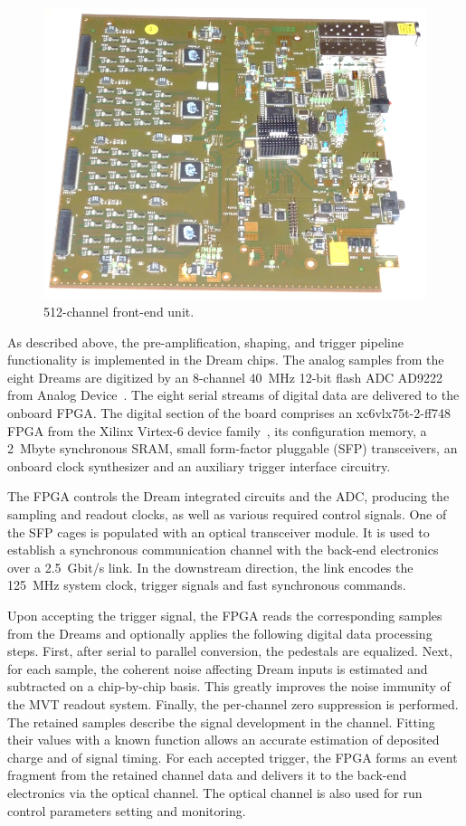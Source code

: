 \begin{figure}[htb]
 \includegraphics[width=1.0\columnwidth,keepaspectratio]{images/electronics_fig3.png}
 \caption{512-channel front-end unit.}
 \label{fig:mm-e_3}
\end{figure}

As described above, the pre-amplification, shaping, and trigger pipeline functionality is implemented in the Dream chips. The analog samples from the eight Dreams are digitized by an 8-channel 40~MHz 12-bit flash ADC AD9222 from Analog Device~\cite{ADC}. The eight serial streams of digital data are delivered to the onboard FPGA.
The digital section of the board comprises an xc6vlx75t-2-ff748 FPGA from the Xilinx Virtex-6 device family~\cite{XIL}, its configuration memory, a 2~Mbyte synchronous SRAM, small form-factor pluggable (SFP) transceivers, an onboard clock synthesizer and an auxiliary trigger interface circuitry.

The FPGA controls the Dream integrated circuits and the ADC, producing the sampling and readout clocks, as well as various required control signals. One of the SFP cages is populated with an optical transceiver module. It is used to establish a synchronous communication channel with the back-end electronics over a 2.5~Gbit/s link. In the downstream direction, the link encodes the 125~MHz system clock, trigger signals and fast synchronous commands.

Upon accepting the trigger signal, the FPGA reads the corresponding samples from the Dreams and optionally applies the following digital data processing steps. First, after serial to parallel conversion, the pedestals are equalized. Next, for each sample, the coherent noise affecting Dream inputs is estimated and subtracted on a chip-by-chip basis. This greatly improves the noise immunity of the MVT readout system. Finally, the per-channel zero suppression is performed. The retained samples describe the signal development in the channel. Fitting their values with a known function allows an accurate estimation of deposited charge and of signal timing. For each accepted trigger, the FPGA forms an event fragment from the retained channel data and delivers it to the back-end electronics via the optical channel. The optical channel is also used for run control parameters setting and monitoring.

